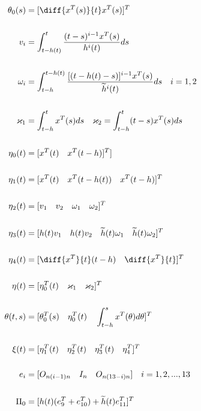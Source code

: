 \documentclass[journal]{IEEEtran}
\begin{document}
 \begin{align}
   \theta _0(s) &= [\diff{x^T(s)}{t} x^T(s)]^T \\ \\
   v_i &= \int ^t _{t-h(t)} \frac{(t-s)^{i-1}x^T(s)}{h^i(t)}ds \\ \\
   \omega _i &= \int ^{t-h(t)} _{t-h} \frac{[(t-h(t)-s)]^{i-1}x^T(s)}{\widetilde{h}^i(t)}ds \quad  i= 1,2 \\ \\
   \varkappa _1 &= \int ^t _{t-h} x^T(s)ds \quad \varkappa _2 =\int ^t _{t-h} (t-s)x^T(s)ds \\ \\
   \eta _0(t) &= [x^T(t)\quad x^T(t-h)]^T] \\ \\
   \eta _1(t) &= [x^T(t)\quad x^T(t-h(t)) \quad x^T(t-h)]^T \\ \\ 
   \eta _2(t) &= [v_1 \quad v_2 \quad \omega _1 \quad \omega _2]^T \\ \\
   \eta _3(t) &= [h(t)v_1 \quad h(t)v_2 \quad \widetilde{h}(t)\omega _1 \quad \widetilde{h}(t)\omega _2]^T \\ \\
   \eta _4(t) &= [\diff{x^T}{t}(t-h)  \quad \diff{x^T}{t}]^T \\ \\
   \eta (t) &=[\eta _0^T(t) \quad \varkappa _1 \quad \varkappa _2]^T  \\ \\
   \theta(t,s)&=[\theta _0^T(s) \quad \eta _0 ^T(t) \quad \int _{t-h}^s x^T(\theta)d\theta]^T \\ \\
   \xi (t) &= [\eta _1^T(t) \quad \eta _2^T(t) \quad  \eta _3^T(t) \quad \eta _4^T]^T   \\ \\
   e_i &= [O_{n(i-1)n}\quad I_n \quad O_{n(13-i)n}] \quad i=1,2,...,13 \\ \\ 
   \Pi_0&=[h(t)(e_9^T +e_{10}^T) +\widetilde{h}(t)e^T_{11} ]^T 
 \end{align}
\end{document}
